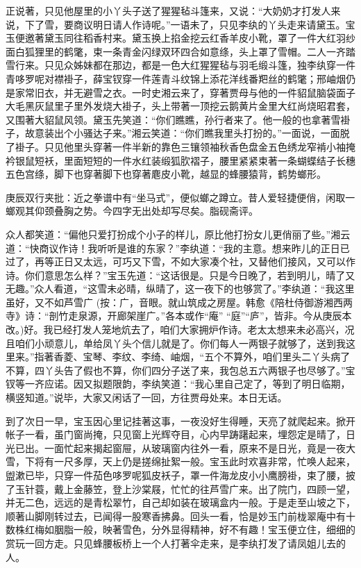\begin{parag}


    正说著，只见他屋里的小丫头子送了猩猩毡斗篷来，又说：“大奶奶才打发人来说，下了雪，要商议明日请人作诗呢。”一语未了，只见李纨的丫头走来请黛玉。宝玉便邀著黛玉同往稻香村来。黛玉换上掐金挖云红香羊皮小靴，罩了一件大红羽纱面白狐狸里的鹤氅，束一条青金闪绿双环四合如意绦，头上罩了雪帽。二人一齐踏雪行来。只见众姊妹都在那边，都是一色大红猩猩毡与羽毛缎斗篷，独李纨穿一件青哆罗呢对襟褂子，薛宝钗穿一件莲青斗纹锦上添花洋线番羓丝的鹤氅；邢岫烟仍是家常旧衣，并无避雪之衣。一时史湘云来了，穿著贾母与他的一件貂鼠脑袋面子大毛黑灰鼠里子里外发烧大褂子，头上带著一顶挖云鹅黄片金里大红尚烧昭君套，又围著大貂鼠风领。黛玉先笑道：“你们瞧瞧，孙行者来了。他一般的也拿著雪褂子，故意装出个小骚达子来。”湘云笑道：“你们瞧我里头打扮的。”一面说，一面脱了褂子。只见他里头穿著一件半新的靠色三镶领袖秋香色盘金五色绣龙窄褃小袖掩衿银鼠短袄，里面短短的一件水红装缎狐肷褶子，腰里紧紧束著一条蝴蝶结子长穗五色宫绦，脚下也穿著脚下也穿著麀皮小靴，越显的蜂腰猿背，鹤势螂形。\begin{note}庚辰双行夹批：近之拳谱中有“坐马式”，便似螂之蹲立。昔人爱轻捷便俏，闲取一螂观其仰颈叠胸之势。今四字无出处却写尽矣。脂砚斋评。\end{note}众人都笑道：“偏他只爱打扮成个小子的样儿，原比他打扮女儿更俏丽了些。”湘云道：“快商议作诗！我听听是谁的东家？”李纨道：“我的主意。想来昨儿的正日已过了，再等正日又太远，可巧又下雪，不如大家凑个社，又替他们接风，又可以作诗。你们意思怎么样？”宝玉先道：“这话很是。只是今日晚了，若到明儿，晴了又无趣。”众人看道，“这雪未必晴，纵晴了，这一夜下的也够赏了。”李纨道：“我这里虽好，又不如芦雪广 (按：广，音眼。就山筑成之房屋。韩愈《陪杜侍御游湘西两寺》诗：“剖竹走泉源，开廊架崖广。”各本或作“庵” “庭”“庐”，皆非。今从庚辰本改。)好。我已经打发人笼地炕去了，咱们大家拥炉作诗。老太太想来未必高兴，况且咱们小顽意儿，单给凤丫头个信儿就是了。你们每人一两银子就够了，送到我这里来。”指著香菱、宝琴、李纹、李绮、岫烟，“五个不算外，咱们里头二丫头病了不算，四丫头告了假也不算，你们四分子送了来，我包总五六两银子也尽够了。”宝钗等一齐应诺。因又拟题限韵，李纨笑道：“我心里自己定了，等到了明日临期，横竖知道。”说毕，大家又闲话了一回，方往贾母处来。本日无话。
\end{parag}


\begin{parag}


    到了次日一早，宝玉因心里记挂著这事，一夜没好生得睡，天亮了就爬起来。掀开帐子一看，虽门窗尚掩，只见窗上光辉夺目，心内早踌躇起来，埋怨定是晴了，日光已出。一面忙起来揭起窗屉，从玻璃窗内往外一看，原来不是日光，竟是一夜大雪，下将有一尺多厚，天上仍是搓绵扯絮一般。宝玉此时欢喜非常，忙唤人起来，盥漱已毕，只穿一件茄色哆罗呢狐皮袄子，罩一件海龙皮小小鹰膀褂，束了腰，披了玉针蓑，戴上金藤笠，登上沙棠屐，忙忙的往芦雪广来。出了院门，四顾一望，并无二色，远远的是青松翠竹，自己却如装在玻璃盒内一般。于是走至山坡之下，顺著山脚刚转过去，已闻得一股寒香拂鼻。回头一看，恰是妙玉门前栊翠庵中有十数株红梅如胭脂一般，映著雪色，分外显得精神，好不有趣！宝玉便立住，细细的赏玩一回方走。只见蜂腰板桥上一个人打著伞走来，是李纨打发了请凤姐儿去的人。
\end{parag}


